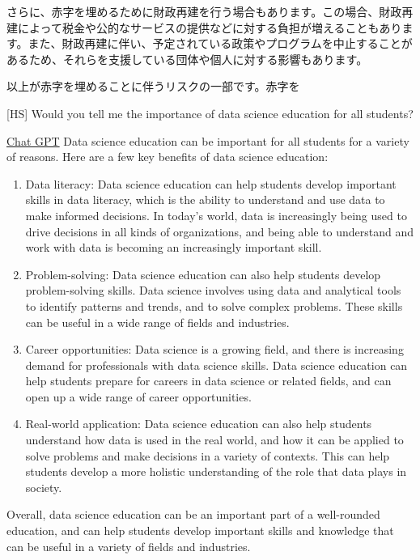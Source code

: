 \documentclass[
]{bxjsbook}
\providecommand{\tightlist}{%
  \setlength{\itemsep}{0pt}\setlength{\parskip}{0pt}}
\theoremstyle{definition}
\theoremstyle{definition}
\theoremstyle{definition}
\theoremstyle{definition}
\theoremstyle{remark}
\begin{document}
さらに、赤字を埋めるために財政再建を行う場合もあります。この場合、財政再建によって税金や公的なサービスの提供などに対する負担が増えることもあります。また、財政再建に伴い、予定されている政策やプログラムを中止することがあるため、それらを支援している団体や個人に対する影響もあります。

以上が赤字を埋めることに伴うリスクの一部です。赤字を

{[}HS{]} Would you tell me the importance of data science education for all students?

\protect\hyperlink{chatgpt}{Chat GPT} Data science education can be important for all students for a variety of reasons. Here are a few key benefits of data science education:

\begin{enumerate}
\def\labelenumi{\arabic{enumi}.}
\tightlist
\item
  Data literacy: Data science education can help students develop important skills in data literacy, which is the ability to understand and use data to make informed decisions. In today's world, data is increasingly being used to drive decisions in all kinds of organizations, and being able to understand and work with data is becoming an increasingly important skill.
\item
  Problem-solving: Data science education can also help students develop problem-solving skills. Data science involves using data and analytical tools to identify patterns and trends, and to solve complex problems. These skills can be useful in a wide range of fields and industries.
\item
  Career opportunities: Data science is a growing field, and there is increasing demand for professionals with data science skills. Data science education can help students prepare for careers in data science or related fields, and can open up a wide range of career opportunities.
\item
  Real-world application: Data science education can also help students understand how data is used in the real world, and how it can be applied to solve problems and make decisions in a variety of contexts. This can help students develop a more holistic understanding of the role that data plays in society.
\end{enumerate}

Overall, data science education can be an important part of a well-rounded education, and can help students develop important skills and knowledge that can be useful in a variety of fields and industries.
\end{document}
